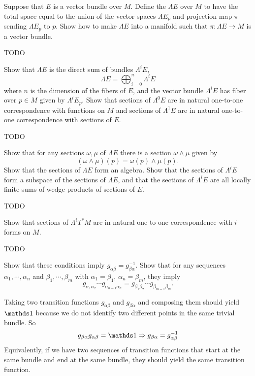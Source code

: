 \documentclass[10pt]{article}
\begin{document}
\begin{example}
	Suppose that $E$ is a vector bundle over $M$. Define the  $\Lambda E$ over $M$ to have the total space equal to the union of the vector spaces $\Lambda E_p$ and projection map $\pi$ sending $\Lambda E_p$ to $p$. Show how to make $\Lambda E$ into a manifold such that $\pi:\Lambda E \to M$ is a vector bundle.
\end{example}
\sol TODO


\begin{example}
	Show that $\Lambda E$ is the direct sum of bundles $\Lambda^i E$,
	$$
	\Lambda E = \bigoplus_{i=0}^{n} \Lambda^i E
	$$
	where $n$ is the dimension of the fibers of $E$, and the vector bundle $\Lambda^i E$ has fiber over $p\in M$ given by $\Lambda^i E_p$. Show that sections of $\Lambda^0 E$ are in natural one-to-one correspondence with functions on $M$ and sections of $\Lambda^1 E$ are in natural one-to-one correspondence with sections of $E$.
\end{example}
\sol TODO


\begin{example}
	Show that for any sections $\omega,\mu$ of $\Lambda E$ there is a section $\omega \wedge \mu$ given by
	$$
	(\omega \wedge \mu)(p) = \omega(p) \wedge \mu(p).
	$$
	Show that the sections of $\Lambda E$ form an algebra. Show that the sections of $\Lambda^i E$ form a subspace of the sections of $\Lambda E$, and that the sections of $\Lambda^i E$ are all locally finite sums of wedge products of sections of $E$.
\end{example}
\sol TODO


\begin{example}
	Show that sections of $\Lambda^i T^*M$ are in natural one-to-one correspondence with $i$-forms on $M$.
\end{example}
\sol TODO


\begin{example}
	Show that these conditions imply $g_{\alpha\beta} = g_{\beta\alpha}^{-1}$. Show that for any sequences $\alpha_1,\cdots,\alpha_n$ and $\beta_1,\cdots,\beta_m$ with $\alpha_1 = \beta_1$, $\alpha_n = \beta_m$, they imply
	$$
	g_{\alpha_1\alpha_2}\cdots g_{\alpha_{n-1}\alpha_n} = g_{\beta_1\beta_2}\cdots g_{\beta_{m-1}\beta_m}.
	$$ 
\end{example}
\sol Taking two transition functions $g_{\alpha\beta}$ and $g_{\beta\alpha}$ and composing them should yield $\id$ because we do not identify two different points in the same trivial bundle. So
$$
g_{\beta\alpha}g_{\alpha\beta} = \id\Rightarrow g_{\beta\alpha} = g_{\alpha\beta}^{-1}
$$
Equivalently, if we have two sequences of transition functions that start at the same bundle and end at the same bundle, they should yield the same transition function.
\end{document}

